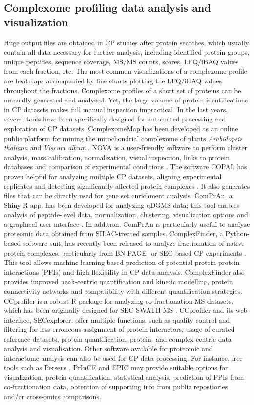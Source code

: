 \subsection*{Complexome profiling data analysis and visualization} \label{ssec:CP_MS_ssec2}
Huge output files are obtained in CP studies after protein searches, which usually contain all data necessary for further analysis, including identified protein groups, unique peptides, sequence coverage, MS/MS counts, scores, LFQ/iBAQ values from each fraction, etc. The most common visualizations of a complexome profile are heatmaps accompanied by line charts plotting the LFQ/iBAQ values throughout the fractions. Complexome profiles of a short set of proteins can be manually generated and analyzed. Yet, the large volume of protein identifications in CP datasets makes full manual inspection impractical. In the last years, several tools have been specifically designed for automated processing and exploration of CP datasets.
ComplexomeMap has been developed as an online public platform for mining the mitochondrial complexome of plants \emph{Arabidopsis thaliana} and \emph{Viscum album} \cite{Senkler_2017}. NOVA is a user-friendly software to perform cluster analysis, mass calibration, normalization, visual inspection, links to protein databases and comparison of experimental conditions \cite{Giese_2015}. The software COPAL has proven helpful for analyzing multiple CP datasets, aligning experimental replicates and detecting significantly affected protein complexes \cite{Van_Strien_2019}. It also generates files that can be directly used for gene set enrichment analysis. ComPrAn, a Shiny R app, has been developed for analyzing qDGMS data; this tool enables analysis of peptide-level data, normalization, clustering, visualization options and a graphical user interface \cite{Palenikova_2021a}. In addition, ComPrAn is particularly useful to analyze proteomic data obtained from SILAC-treated samples. ComplexFinder, a Python-based software suit, has recently been released to analyze fractionation of native protein complexes, particularly from BN-PAGE- or SEC-based CP experiments \cite{Nolte_2021}. This tool allows machine learning-based prediction of potential protein-protein interactions (PPIs) and high flexibility in CP data analysis. ComplexFinder also provides improved peak-centric quantification and kinetic modelling, protein connectivity networks and compatibility with different quantification strategies. CCprofiler is a robust R package for analyzing co-fractionation MS datasets, which has been originally designed for SEC-SWATH-MS \cite{Heusel_2019}. CCprofiler and its web interface, SECexplorer, offer multiple functions, such as quality control and filtering for less erroneous assignment of protein interactors, usage of curated reference datasets, protein quantification, protein- and complex-centric data analysis and visualization.
Other software available for proteomic and interactome analysis can also be used for CP data processing. For instance, free tools such as Perseus \cite{Tyanova_2016b}, PrInCE \cite{Stacey_2017} and EPIC \cite{Hu_2019} may provide suitable options for visualization, protein quantification, statistical analysis, prediction of PPIs from co-fractionation data, obtention of supporting info from public repositories and/or cross-omics comparisons.
%
